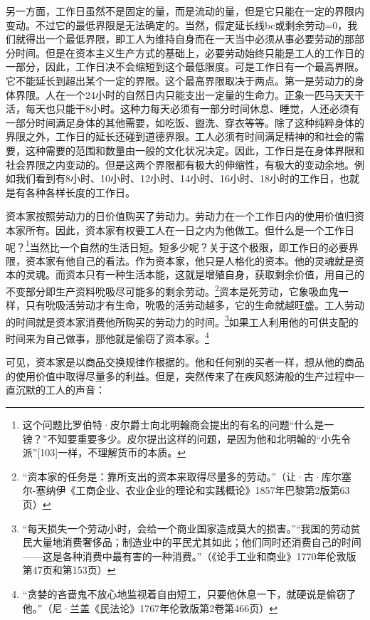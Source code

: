 \documentclass{ctexbook}
\begin{document}
    另一方面，工作日虽然不是固定的量，而是流动的量，但是它只能在一定的界限内变动。不过它的最低界限是无法确定的。当然，假定延长线bc或剩余劳动=0，我们就得出一个最低界限，即工人为维持自身而在一天当中必须从事必要劳动的那部分时间。但是在资本主义生产方式的基础上，必要劳动始终只能是工人的工作日的一部分，因此，工作日决不会缩短到这个最低限度。可是工作日有一个最高界限。它不能延长到超出某个一定的界限。这个最高界限取决于两点。第一是劳动力的身体界限。人在一个24小时的自然日内只能支出一定量的生命力。正象一匹马天天干活，每天也只能干8小时。这种力每天必须有一部分时间休息、睡觉，人还必须有一部分时间满足身体的其他需要，如吃饭、盥洗、穿衣等等。除了这种纯粹身体的界限之外，工作日的延长还碰到道德界限。工人必须有时间满足精神的和社会的需要，这种需要的范围和数量由一般的文化状况决定。因此，工作日是在身体界限和社会界限之内变动的。但是这两个界限都有极大的伸缩性，有极大的变动余地。例如我们看到有8小时、10小时、12小时、14小时、16小时、18小时的工作日，也就是有各种各样长度的工作日。

    资本家按照劳动力的日价值购买了劳动力。劳动力在一个工作日内的使用价值归资本家所有。因此，资本家有权要工人在一日之内为他做工。但什么是一个工作日呢？\footnote{这个问题比罗伯特·皮尔爵士向北明翰商会提出的有名的问题“什么是一镑？”不知要重要多少。皮尔提出这样的问题，是因为他和北明翰的“小先令派”[103]一样，不理解货币的本质。}当然比一个自然的生活日短。短多少呢？关于这个极限，即工作日的必要界限，资本家有他自己的看法。作为资本家，他只是人格化的资本。他的灵魂就是资本的灵魂。而资本只有一种生活本能，这就是增殖自身，获取剩余价值，用自己的不变部分即生产资料吮吸尽可能多的剩余劳动。\footnote{“资本家的任务是：靠所支出的资本来取得尽量多的劳动。”（让·古·库尔塞尔-塞纳伊《工商企业、农业企业的理论和实践概论》1857年巴黎第2版第63页）}资本是死劳动，它象吸血鬼一样，只有吮吸活劳动才有生命，吮吸的活劳动越多，它的生命就越旺盛。工人劳动的时间就是资本家消费他所购买的劳动力的时间。\footnote{“每天损失一个劳动小时，会给一个商业国家造成莫大的损害。”“我国的劳动贫民大量地消费奢侈品；制造业中的平民尤其如此；他们同时还消费自己的时间——这是各种消费中最有害的一种消费。”（《论手工业和商业》1770年伦敦版第47页和第153页）}如果工人利用他的可供支配的时间来为自己做事，那他就是偷窃了资本家。\footnote{“贪婪的吝啬鬼不放心地监视着自由短工，只要他休息一下，就硬说是偷窃了他。”（尼·兰盖《民法论》1767年伦敦版第2卷第466页）}

    可见，资本家是以商品交换规律作根据的。他和任何别的买者一样，想从他的商品的使用价值中取得尽量多的利益。但是，突然传来了在疾风怒涛般的生产过程中一直沉默的工人的声音：
\end{document}
